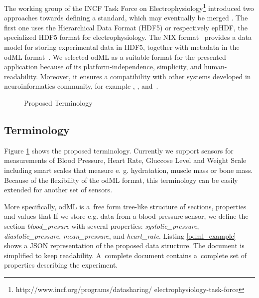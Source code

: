 \documentclass[a4paper,twoside]{article}
\begin{document}
The working group of the INCF Task Force on Electrophysiology\footnote{http://www.incf.org/programs/datasharing/ electrophysiology-task-force} introduced two approaches towards defining a standard, which may eventually be merged \cite{10.3389/conf.fninf.2013.09.00069}. The first one uses the Hierarchical Data Format (HDF5) \cite{hdf5} or respectively epHDF, the  specialized HDF5 format for electrophysiology. The NIX format~\cite{Stoewer:2014} provides a data model for storing experimental data in HDF5, together with metadata in the odML format~\cite{10.3389/fninf.2011.00016}. We selected odML as a suitable format for the presented application because of its platform-independence, simplicity, and human-readability. Moreover, it ensures a compatibility with other systems developed in neuroinformatics community, for example \cite{10.3389/conf.fninf.2014.18.00029}, \cite{10.3389/conf.fninf.2014.18.00053}, and~\cite{10.3389/conf.fninf.2013.09.00025}.

\begin{figure}

  \centering
   {}
  \caption{Proposed Terminology}
  \label{fig:Terminology}
 \end{figure}


\subsection{Terminology}

Figure \ref{fig:Terminology} shows the proposed terminology. Currently we support sensors for measurements of Blood Pressure, Heart Rate, Gluccose Level and Weight Scale including smart scales that measure e. g. hydratation, muscle mass or bone mass. Because of the flexibility of the odML format, this terminology can be easily extended for another set of sensors.


More specifically, odML is a~free form tree-like structure of sections, properties and values that  If we store e.g. data from a blood pressure sensor, we define the section \emph{blood\_presure} with several properties: \textit{systolic\_pressure}, \textit{diastolic\_pressure}, \textit{mean\_pressure}, and \textit{heart\_rate}. Listing \ref{odml_example} shows a JSON representation of the proposed data structure. The document is simplified to keep readability. A~complete document contains a~complete set of properties describing the experiment.
\end{document}
